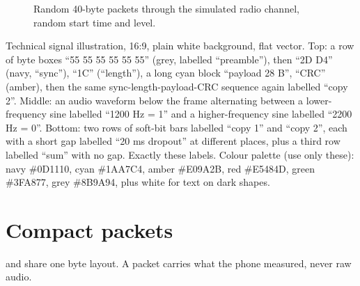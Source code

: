 \begin{figure}[htbp]\centering
{}
\caption{Random 40-byte packets through the simulated radio channel, random start time and level.}\label{fig:modemchart}
\end{figure}

{Technical signal illustration, 16:9, plain white background, flat vector. Top: a row of byte boxes ``55 55 55 55 55 55'' (grey,
labelled ``preamble''), then ``2D D4'' (navy, ``sync''), ``1C'' (``length''), a long cyan block ``payload 28 B'', ``CRC'' (amber),
then the same sync-length-payload-CRC sequence again labelled ``copy 2''. Middle: an audio waveform below the frame alternating
between a lower-frequency sine labelled ``1200 Hz = 1'' and a higher-frequency sine labelled ``2200 Hz = 0''. Bottom: two
rows of soft-bit bars labelled ``copy 1'' and ``copy 2'', each with a short gap labelled ``20 ms dropout'' at different places,
plus a third row labelled ``sum'' with no gap. Exactly these labels. Colour palette (use only these): navy \#0D1110, cyan \#1AA7C4, amber \#E09A2B, red \#E5484D, green \#3FA877, grey \#8B9A94, plus white for text on dark shapes.}

\section{Compact packets}

 and  share one byte layout. A packet carries what the phone measured, never raw audio.

